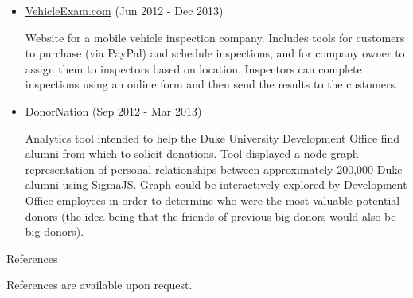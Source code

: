 \documentclass{article}
\begin{document}
    \begin{itemize}
        \item \href{http://vehicleexam.com}{VehicleExam.com}
        {
            \color{fade-gray}
            \small
            (Jun 2012 - Dec 2013)
        }

        Website for a mobile vehicle inspection company. Includes tools for customers to purchase (via PayPal) and schedule inspections, and for company owner to assign them to inspectors based on location. Inspectors can complete inspections using an online form and then send the results to the customers.

        \item DonorNation
        {
            \color{fade-gray}
            \small
            (Sep 2012 - Mar 2013)
        }

        Analytics tool intended to help the Duke University Development Office find alumni from which to solicit donations. Tool displayed a node graph representation of personal relationships between approximately 200,000 Duke alumni using SigmaJS. Graph could be interactively explored by Development Office employees in order to determine who were the most valuable potential donors (the idea being that the friends of previous big donors would also be big donors).

    \end{itemize}



    \bigskip\bigskip\bigskip

    {
        \noindent\Large
        References
    }

    \noindent\makebox[\linewidth]{\rule{\textwidth}{0.4pt}}
    \medskip

    References are available upon request.
        
\end{document}
